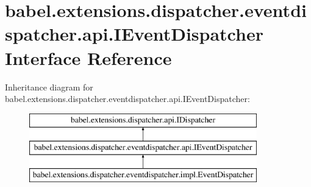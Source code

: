 \hypertarget{interfacebabel_1_1extensions_1_1dispatcher_1_1eventdispatcher_1_1api_1_1_i_event_dispatcher}{\section{babel.\-extensions.\-dispatcher.\-eventdispatcher.\-api.\-I\-Event\-Dispatcher Interface Reference}
\label{interfacebabel_1_1extensions_1_1dispatcher_1_1eventdispatcher_1_1api_1_1_i_event_dispatcher}
}
Inheritance diagram for babel.\-extensions.\-dispatcher.\-eventdispatcher.\-api.\-I\-Event\-Dispatcher\-:\begin{figure}[H]
\begin{center}
\leavevmode
\includegraphics[height=3.000000cm]{interfacebabel_1_1extensions_1_1dispatcher_1_1eventdispatcher_1_1api_1_1_i_event_dispatcher}
\end{center}
\end{figure}
